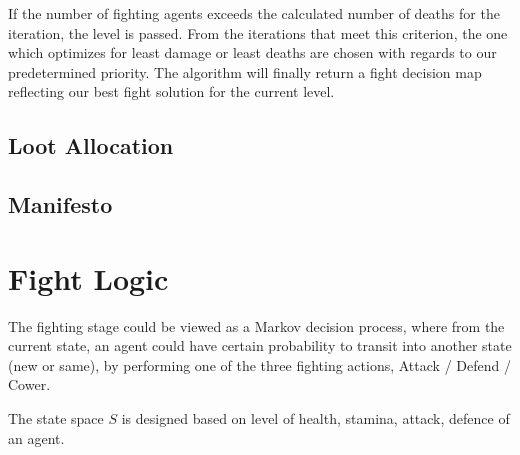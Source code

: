 \noindent If the number of fighting agents exceeds the calculated number of deaths for the iteration, the level is passed. From the iterations that meet this criterion, the one which optimizes for least damage or least deaths are chosen with regards to our predetermined priority. The algorithm will finally return a fight decision map reflecting our best fight solution for the current level. 



\subsection{Loot Allocation}
\subsection{Manifesto}



\section{Fight Logic}
The fighting stage could be viewed as a Markov decision process, where from the current state, an agent could have certain probability to transit into another state (new or same), by performing one of the three fighting actions, Attack / Defend / Cower.

The state space $S$ is designed based on level of health, stamina, attack, defence of an agent. 

\noindent

